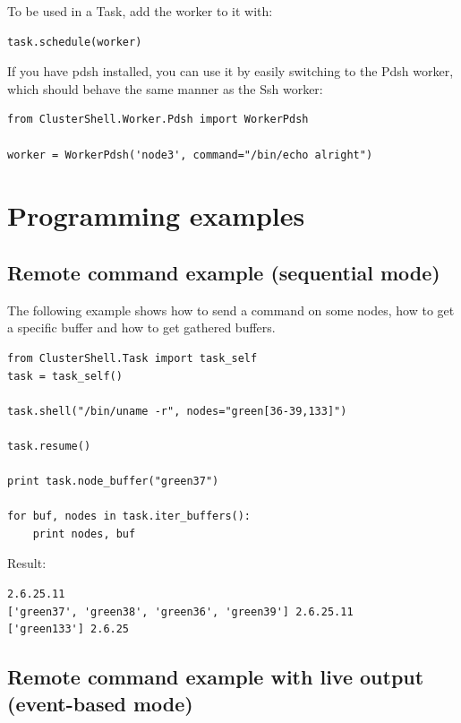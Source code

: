 \documentclass[english,a4paper]{csuserguide}
\begin{document}
To be used in a Task, add the worker to it with:
\medskip
\begin{lstlisting}[breaklines=true, breakatwhitespace=true]
task.schedule(worker)
\end{lstlisting}

\pagebreak[2]

If you have pdsh installed, you can use it by easily switching to the Pdsh worker, which should behave the same manner as the Ssh worker:
\medskip
\begin{lstlisting}[breaklines=true, breakatwhitespace=true]
from ClusterShell.Worker.Pdsh import WorkerPdsh

worker = WorkerPdsh('node3', command="/bin/echo alright")
\end{lstlisting}


\newpage

\section{Programming examples}

\subsection{Remote command example (sequential mode)}

The following example shows how to send a command on some nodes, how to get a specific buffer and how to get gathered buffers.
\medskip
\begin{lstlisting}[breaklines=true, breakatwhitespace=true]
from ClusterShell.Task import task_self
task = task_self()

task.shell("/bin/uname -r", nodes="green[36-39,133]")

task.resume()

print task.node_buffer("green37")

for buf, nodes in task.iter_buffers():
	print nodes, buf

\end{lstlisting}

Result:
\begin{verbatim}
2.6.25.11
['green37', 'green38', 'green36', 'green39'] 2.6.25.11
['green133'] 2.6.25
\end{verbatim}

\subsection{Remote command example with live output (event-based mode)}
\end{document}
